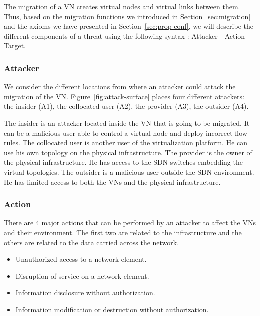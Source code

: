 

\label{sec:attacker-model}
The migration of a VN creates virtual nodes and virtual links between them.
Thus, based on  the migration functions we introduced in Section~\ref{sec:migration} and the axioms we have presented in Section~\ref{sec:prop-conf}, we will describe the different components of a threat using the following syntax
: Attacker - Action - Target.

\subsubsection{Attacker}
We consider the different locations from where an attacker could attack the migration of the VN. 
Figure~\ref{fig:attack-surface} places four different attackers: the insider (A1), the collocated user (A2), the provider (A3), the outsider (A4).

The insider is an attacker located inside the VN that is going to be migrated.
It can be a malicious user able to control a virtual node and deploy incorrect flow rules.
The collocated user is another user of the virtualization platform.
He can use his own topology on the physical infrastructure.
The provider is the owner of the physical infrastructure.
He has access to the SDN switches embedding the virtual topologies.
The outsider is a malicious user outside the SDN environment.
He has limited access to both the VNs and the physical infrastructure.

\subsubsection{Action}
There are 4 major actions that can be performed by an attacker to affect the VNs and their environment.
The first two are related to the infrastructure and the others are related to the data carried across the network.
\begin{itemize}
\item Unauthorized access to a network element.
\item Disruption of service on a network element.
\item Information disclosure without authorization.
\item Information modification or destruction without authorization.
\end{itemize}

